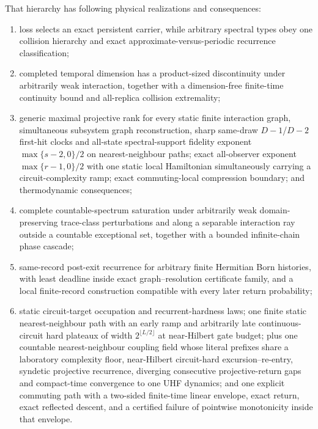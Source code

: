 That hierarchy has following physical realizations and consequences:
\begin{enumerate}[leftmargin=1.6em]
\item loss selects an exact persistent carrier, while arbitrary spectral
      types obey one collision hierarchy and exact approximate-versus-periodic
      recurrence classification;
\item completed temporal dimension has a product-sized discontinuity under
      arbitrarily weak interaction, together with a dimension-free finite-time
      continuity bound and all-replica collision extremality;
\item generic maximal projective rank for every static finite interaction
      graph, simultaneous subsystem graph reconstruction, sharp same-draw
      $D-1$/$D-2$ first-hit clocks and all-state spectral-support fidelity
      exponent $\max\{s-2,0\}/2$ on nearest-neighbour paths; exact
      all-observer exponent $\max\{r-1,0\}/2$ with one static local
      Hamiltonian simultaneously carrying a circuit-complexity ramp; exact
      commuting-local compression boundary; and thermodynamic consequences;
\item complete countable-spectrum saturation under arbitrarily weak
      domain-preserving trace-class perturbations and along a separable
      interaction ray outside a countable exceptional set, together with a
      bounded infinite-chain phase cascade;
\item same-record post-exit recurrence for arbitrary finite Hermitian Born
      histories, with least deadline inside exact graph--resolution
      certificate family, and a local finite-record construction compatible
      with every later return probability;
\item static circuit-target occupation and recurrent-hardness laws; one
      finite static nearest-neighbour path with an early ramp and arbitrarily
      late continuous-circuit hard plateaux of width
      $2^{\lfloor L/2\rfloor}$ at near-Hilbert gate budget; plus one countable
      nearest-neighbour coupling field whose literal prefixes
      share a laboratory complexity floor, near-Hilbert circuit-hard
      excursion--re-entry, syndetic projective recurrence, diverging
      consecutive projective-return gaps and compact-time convergence to one UHF
      dynamics; and one explicit commuting path with
      a two-sided finite-time linear envelope, exact return, exact reflected
      descent, and a certified failure of pointwise monotonicity inside that
      envelope.
\end{enumerate}

